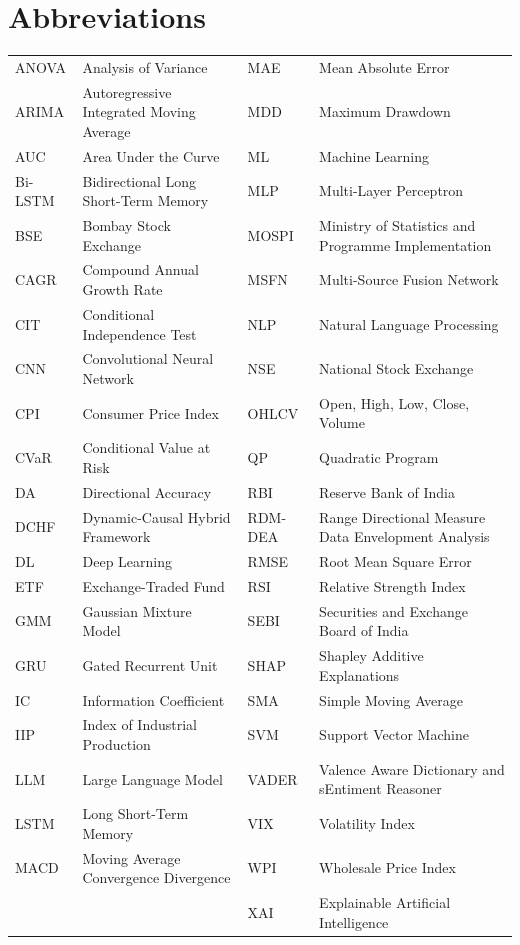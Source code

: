 \chapter*{Abbreviations}

\begin{center}
\footnotesize
{}
\begin{tabular}{@{}p{1.9cm}p{4.5cm}p{1.9cm}p{4.9cm}@{}}
ANOVA & Analysis of Variance & MAE & Mean Absolute Error\\
ARIMA & Autoregressive Integrated Moving Average & MDD & Maximum Drawdown\\
AUC & Area Under the Curve & ML & Machine Learning\\
Bi-LSTM & Bidirectional Long Short-Term Memory & MLP & Multi-Layer Perceptron\\
BSE & Bombay Stock Exchange & MOSPI & Ministry of Statistics and Programme Implementation\\
CAGR & Compound Annual Growth Rate & MSFN & Multi-Source Fusion Network\\
CIT & Conditional Independence Test & NLP & Natural Language Processing\\
CNN & Convolutional Neural Network & NSE & National Stock Exchange\\
CPI & Consumer Price Index & OHLCV & Open, High, Low, Close, Volume\\
CVaR & Conditional Value at Risk & QP & Quadratic Program\\
DA & Directional Accuracy & RBI & Reserve Bank of India\\
DCHF & Dynamic-Causal Hybrid Framework & RDM-DEA & Range Directional Measure Data Envelopment Analysis\\
DL & Deep Learning & RMSE & Root Mean Square Error\\
ETF & Exchange-Traded Fund & RSI & Relative Strength Index\\
GMM & Gaussian Mixture Model & SEBI & Securities and Exchange Board of India\\
GRU & Gated Recurrent Unit & SHAP & Shapley Additive Explanations\\
IC & Information Coefficient & SMA & Simple Moving Average\\
IIP & Index of Industrial Production & SVM & Support Vector Machine\\
LLM & Large Language Model & VADER & Valence Aware Dictionary and sEntiment Reasoner\\
LSTM & Long Short-Term Memory & VIX & Volatility Index\\
MACD & Moving Average Convergence Divergence & WPI & Wholesale Price Index\\
& & XAI & Explainable Artificial Intelligence\\
\end{tabular}
\end{center}
